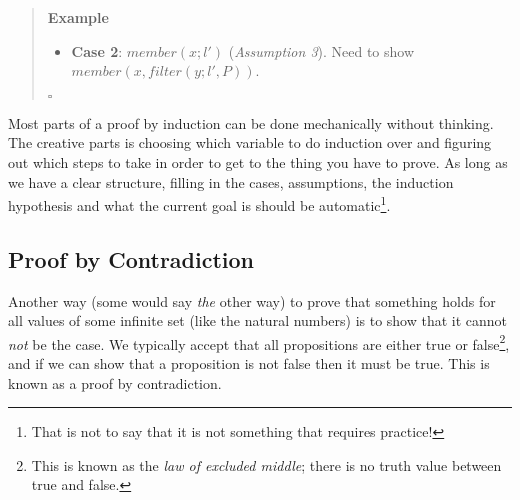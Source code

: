 \documentclass{tufte-handout}
\newcounter{example}
\newcounter{exc:first:proof}
\newenvironment{example}
{\refstepcounter{example}\begin{quote}
\textbf{Example \arabic{example}}}
{

$\square$\end{quote}}
\begin{document}
\begin{example}
\begin{itemize}
\begin{itemize}
      \item \textbf{Case 2}: $\mathit{member}(x; l')$
        (\textit{Assumption 3}). Need to show
        $\mathit{member}(x, \mathit{filter}(y; l', P))$.
      \end{itemize}
  \end{itemize}
\end{example}

Most parts of a proof by induction can be done mechanically
without thinking. The creative parts is choosing which variable to
do induction over and figuring out which steps to take in order to
get to the thing you have to prove. As long as we have a clear
structure, filling in the cases, assumptions, the induction
hypothesis and what the current goal is should be
automatic\footnote{That is not to say that it is not something
  that requires practice! }.


\subsection{Proof by Contradiction}

Another way (some would say \emph{the} other way) to prove that
something holds for all values of some infinite set (like the
natural numbers) is to show that it cannot \emph{not} be the case.
We typically accept that all propositions are either true or
false\footnote{This is known as the \emph{law of excluded middle};
  there is no truth value between true and false. }, and if we can
show that a proposition is not false then it must be true. This is
known as a proof by contradiction.
\end{document}
